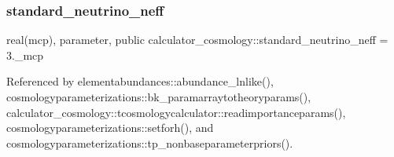 \subsubsection{\texorpdfstring{standard\+\_\+neutrino\+\_\+neff}{standard\_neutrino\_neff}}
{\footnotesize\ttfamily real(mcp), parameter, public calculator\+\_\+cosmology\+::standard\+\_\+neutrino\+\_\+neff = 3.\+\_\+mcp}



Referenced by elementabundances\+::abundance\+\_\+lnlike(), cosmologyparameterizations\+::bk\+\_\+paramarraytotheoryparams(), calculator\+\_\+cosmology\+::tcosmologycalculator\+::readimportanceparams(), cosmologyparameterizations\+::setforh(), and cosmologyparameterizations\+::tp\+\_\+nonbaseparameterpriors().

